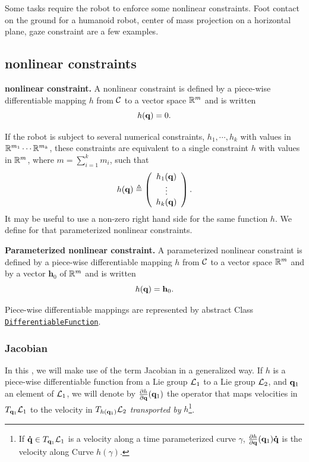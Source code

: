 Some tasks require the robot to enforce some nonlinear constraints. Foot contact on the ground for a humanoid robot, center of mass projection on a horizontal plane, gaze constraint are a few examples.

\subsection{nonlinear constraints}

\begin{definition}\textbf{nonlinear constraint.} A nonlinear constraint is defined by a {\color{blue} piece-wise} differentiable mapping $h$ from $\mathcal{C}$ to a vector space $\mathbb{R}^m$ and is written
\begin{equation}\label{eq:constraint}
h(\conf) = 0.
\end{equation}
\end{definition}
If the robot is subject to several numerical constraints, $h_1,\cdots,h_k$ with values in $\mathbb{R}^{m_1}\cdots\mathbb{R}^{m_k}$, these constraints are equivalent to a single constraint $h$ with values in $\mathbb{R}^{m}$, where $m=\sum_{i=1}^k m_i$, such that
$$
h(\mathbf{q}) \triangleq \left(\begin{array}{c} h_1(\mathbf{q}) \\ \vdots \\ h_k(\mathbf{q})
\end{array}\right).
$$
It may be useful to use a non-zero right hand side for the same function $h$. We define for that parameterized nonlinear constraints.
\begin{definition}\textbf{Parameterized nonlinear constraint.}
  A parameterized nonlinear constraint is defined by a {\color{blue} piece-wise} differentiable mapping $h$ from $\mathcal{C}$ to a vector space $\mathbb{R}^m$ and by a vector $\mathbf{h}_0$ of $\mathbb{R}^m$ and is written
  $$
  h(\mathbf{q}) = \mathbf{h}_0.
  $$
\end{definition}
{\color{blue} Piece-wise} differentiable mappings are represented by abstract Class\\ \href{https://gepettoweb.laas.fr/hpp/hpp-constraints/doxygen-html/classhpp_1_1constraints_1_1DifferentiableFunction.html}{\texttt{DifferentiableFunction}}.

\subsubsection{Jacobian}

In this \paper, we will make use of the term Jacobian in a generalized way.
If $h$ is a {\color{blue} piece-wise} differentiable function from a Lie group $\mathcal{L}_1$ to a Lie group $\mathcal{L}_2$, and $\mathbf{q}_1$ an element of $\mathcal{L}_1$, we will denote by $\frac{\partial h}{\partial\mathbf{q}}(\mathbf{q}_1)$ the operator that maps velocities in $T_{\mathbf{q}_1}\mathcal{L}_1$ to the velocity in $T_{h(\mathbf{q}_1)}\mathcal{L}_2$ \textit{transported by} $h$\footnote{If $\mathbf{\dot{q}}\in T_{\mathbf{q}_1}\mathcal{L}_1$ is a velocity along a time parameterized curve $\gamma$, $\frac{\partial h}{\partial\mathbf{q}}(\mathbf{q}_1)\mathbf{\dot{q}}$ is the velocity along Curve $h(\gamma)$.}.

